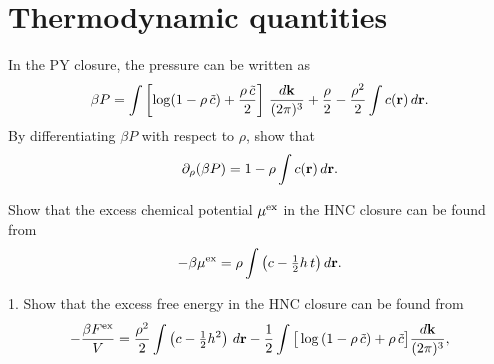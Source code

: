 \documentclass{book}
\begin{document}
\section{Thermodynamic quantities}




In the PY closure, the pressure can be written as\cite{baxterpressure}
\begin{align}
  \beta P =  \int \left[
    \log(1-\rho \,\tilde{c}) + \frac{ \rho \, \tilde{c} }{2}
  \right] \, \frac{ d \boldsymbol{\mathbf{k}} }{(2\pi)^3}
  +
  \frac{\rho}{2}
  - \frac{\rho^2}{2} \int c(\boldsymbol{\mathbf{r}}) \, d\boldsymbol{\mathbf{r}}.
  \label{eq:Pbaxter}
\end{align}
%
By differentiating $\beta P$ with respect to $\rho$,
show that
\begin{align}
  \partial_\rho (\beta P) = 1 - \rho \int c(\boldsymbol{\mathbf{r}}) \, d\boldsymbol{\mathbf{r}}.
\end{align}





Show that the excess chemical potential ${ { \mu }^{ \mathrm{ex} } }$ in the HNC closure
can be found from\cite{morita1960, singer1985}
\begin{equation}
  -\beta { { \mu }^{ \mathrm{ex} } } = \rho \int \left( c - \tfrac{1}{2} h \, t\right) d\boldsymbol{\mathbf{r}}.
  \label{eq:muexhnc}
\end{equation}




1. Show that the excess free energy in the HNC closure
can be found from\cite{morita1958, morita1960, singer1985}
\begin{align}
    - \frac{ \beta { { F }^{ \mathrm{ex} } } } { V }
    = \frac{\rho^2}{2} \int \left( c - \tfrac{1}{2} h^2 \right) \, d\boldsymbol{\mathbf{r}}
      - \frac{1}{2} \int  \big[
              \log\left( 1 - \rho \, \tilde{c} \right)
                           + \rho \, \tilde{c}
                         \big]  \frac{ d \boldsymbol{\mathbf{k}} }{(2\pi)^3},
\label{eq:Fexhnc}
\end{align}
\end{document}
